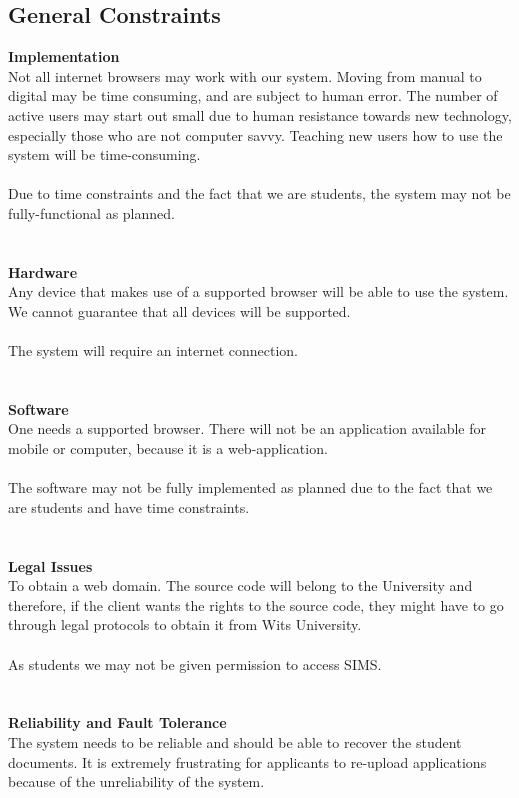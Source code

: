 \documentclass{article}
\begin{document}
\subsection{General Constraints}
\textbf{Implementation} \\ 
Not all internet browsers may work with our system. Moving from manual to digital may be time consuming, and are subject to human error. The number of active users may start out small due to human resistance towards new technology, especially those who are not computer savvy. Teaching new users how to use the system will be time-consuming. \\ \\
Due to time constraints and the fact that we are students, the system may not be fully-functional as planned. \\ \\ \\
\textbf{Hardware} \\
Any device that makes use of a supported browser will be able to use the system. We cannot guarantee that all devices will be supported. \\ \\
The system will require an internet connection. \\ \\ \\
\textbf{Software}\\
One needs a supported browser. There will not be an application available for mobile or computer, because it is a web-application. \\ \\
The software may not be fully implemented as planned due to the fact that we are students and have time constraints. \\ \\ \\
\textbf{Legal Issues} \\
To obtain a web domain. The source code will belong to the University and therefore, if the client wants the rights to the source code, they might have to go through legal protocols to obtain it from Wits University. \\ \\
As students we may not be given permission to access SIMS. \\ \\ \\
\textbf{Reliability and Fault Tolerance} \\
The system needs to be reliable and should be able to recover the student documents. It is extremely frustrating for applicants to re-upload applications because of the unreliability of the system.  \\ \\
\end{document}

